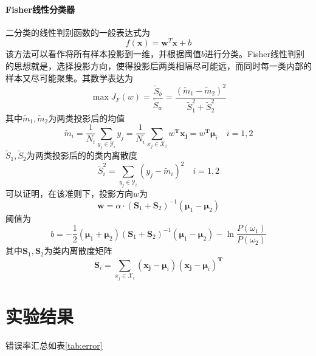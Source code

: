 \paragraph{Fisher线性分类器}
二分类的线性判别函数的一般表达式为
\begin{equation}
f(\mathbf{x}) = \mathbf{w}^T \mathbf{x} + b
\end{equation}
该方法可以看作将所有样本投影到一维，并根据阈值$b$进行分类。Fisher线性判别的思想就是，选择投影方向，使得投影后两类相隔尽可能远，而同时每一类内部的样本又尽可能聚集。其数学表达为
\begin{equation}
\max J_F(w)=\frac{\tilde{S}_b}{\tilde{S}_w}=\frac{(\tilde{m}_1-\tilde{m}_2)^2}{\tilde{S}_1^2+\tilde{S}_2^2}
\end{equation}
其中$\tilde{m}_1, \tilde{m}_2$为两类投影后的均值
\begin{equation}
\tilde{m}_i=\frac1{N_i}\sum_{y_j\in \mathcal{Y}_i}y_j=\frac1{N_i}\sum_{x_j\in \mathcal{X}_i}w^\mathbf{T}\boldsymbol{x_j}=w^\mathbf{T}\boldsymbol{\mu}_i\quad i=1,2
\end{equation}
$\tilde{S}_1, \tilde{S}_2$为两类投影后的的类内离散度
\begin{equation}
\tilde{S}_i^2=\sum_{y_j\in \mathcal{Y}_i}(y_j-\tilde{m}_i)^2\quad i=1,2
\end{equation}
可以证明，在该准则下，投影方向$w$为
\begin{equation}
\mathbf{w} = \alpha \cdot (\mathbf{S}_1 + \mathbf{S}_2)^{-1} (\boldsymbol{\mu}_1 - \boldsymbol{\mu}_2)
\end{equation}
阈值为
\begin{equation}
b = -\frac12(\boldsymbol{\mu}_1 + \boldsymbol{\mu}_2)(\mathbf{S}_1 + \mathbf{S}_2)^{-1} (\boldsymbol{\mu}_1 - \boldsymbol{\mu}_2)-\ln\frac{P(\omega_1)}{P(\omega_2)}
\end{equation}
其中$\mathbf{S}_1, \mathbf{S}_2$为类内离散度矩阵
\begin{equation}
\mathbf{S}_i=\sum_{x_j\in \mathcal{X}_i}(\boldsymbol{x_j}-\boldsymbol{\mu}_i)(\boldsymbol{x_j}-\boldsymbol{\mu}_i)^\mathbf{T}
\end{equation}

\section{实验结果}
错误率汇总如表\ref{tab:error}

